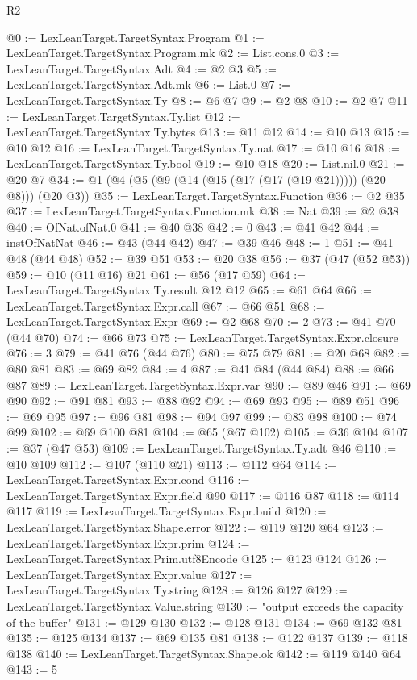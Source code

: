 \begin{lexlean}{R2}
\begin{coremodule}
{{{{{{{{{{{{{{{{{{{{{{{{{{{{{{{{{{{{{{{{{{{{{{@0 := LexLeanTarget.TargetSyntax.Program
@1 := LexLeanTarget.TargetSyntax.Program.mk
@2 := List.cons.{0}
@3 := LexLeanTarget.TargetSyntax.Adt
@4 := @2 @3
@5 := LexLeanTarget.TargetSyntax.Adt.mk
@6 := List.{0}
@7 := LexLeanTarget.TargetSyntax.Ty
@8 := @6 @7
@9 := @2 @8
@10 := @2 @7
@11 := LexLeanTarget.TargetSyntax.Ty.list
@12 := LexLeanTarget.TargetSyntax.Ty.bytes
@13 := @11 @12
@14 := @10 @13
@15 := @10 @12
@16 := LexLeanTarget.TargetSyntax.Ty.nat
@17 := @10 @16
@18 := LexLeanTarget.TargetSyntax.Ty.bool
@19 := @10 @18
@20 := List.nil.{0}
@21 := @20 @7
@34 := @1 (@4 (@5 (@9 (@14 (@15 (@17 (@17 (@19 @21))))) (@20 @8))) (@20 @3))
@35 := LexLeanTarget.TargetSyntax.Function
@36 := @2 @35
@37 := LexLeanTarget.TargetSyntax.Function.mk
@38 := Nat
@39 := @2 @38
@40 := OfNat.ofNat.{0}
@41 := @40 @38
@42 := 0
@43 := @41 @42
@44 := instOfNatNat
@46 := @43 (@44 @42)
@47 := @39 @46
@48 := 1
@51 := @41 @48 (@44 @48)
@52 := @39 @51
@53 := @20 @38
@56 := @37 (@47 (@52 @53))
@59 := @10 (@11 @16) @21
@61 := @56 (@17 @59)
@64 := LexLeanTarget.TargetSyntax.Ty.result @12 @12
@65 := @61 @64
@66 := LexLeanTarget.TargetSyntax.Expr.call
@67 := @66 @51
@68 := LexLeanTarget.TargetSyntax.Expr
@69 := @2 @68
@70 := 2
@73 := @41 @70 (@44 @70)
@74 := @66 @73
@75 := LexLeanTarget.TargetSyntax.Expr.closure
@76 := 3
@79 := @41 @76 (@44 @76)
@80 := @75 @79
@81 := @20 @68
@82 := @80 @81
@83 := @69 @82
@84 := 4
@87 := @41 @84 (@44 @84)
@88 := @66 @87
@89 := LexLeanTarget.TargetSyntax.Expr.var
@90 := @89 @46
@91 := @69 @90
@92 := @91 @81
@93 := @88 @92
@94 := @69 @93
@95 := @89 @51
@96 := @69 @95
@97 := @96 @81
@98 := @94 @97
@99 := @83 @98
@100 := @74 @99
@102 := @69 @100 @81
@104 := @65 (@67 @102)
@105 := @36 @104
@107 := @37 (@47 @53)
@109 := LexLeanTarget.TargetSyntax.Ty.adt @46
@110 := @10 @109
@112 := @107 (@110 @21)
@113 := @112 @64
@114 := LexLeanTarget.TargetSyntax.Expr.cond
@116 := LexLeanTarget.TargetSyntax.Expr.field @90
@117 := @116 @87
@118 := @114 @117
@119 := LexLeanTarget.TargetSyntax.Expr.build
@120 := LexLeanTarget.TargetSyntax.Shape.error
@122 := @119 @120 @64
@123 := LexLeanTarget.TargetSyntax.Expr.prim
@124 := LexLeanTarget.TargetSyntax.Prim.utf8Encode
@125 := @123 @124
@126 := LexLeanTarget.TargetSyntax.Expr.value
@127 := LexLeanTarget.TargetSyntax.Ty.string
@128 := @126 @127
@129 := LexLeanTarget.TargetSyntax.Value.string
@130 := "output exceeds the capacity of the buffer"
@131 := @129 @130
@132 := @128 @131
@134 := @69 @132 @81
@135 := @125 @134
@137 := @69 @135 @81
@138 := @122 @137
@139 := @118 @138
@140 := LexLeanTarget.TargetSyntax.Shape.ok
@142 := @119 @140 @64
@143 := 5
}}}}}}}}}}}}}}}}}}}}}}}}}}}}}}}}}}}}}}}}}}}}}}
\end{coremodule}
\end{lexlean}
